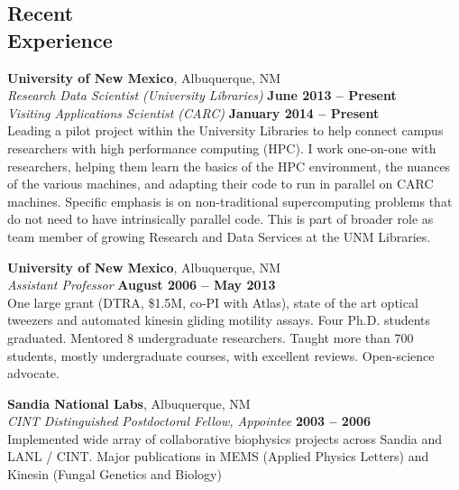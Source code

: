 \documentclass[margin,line]{resume}
\begin{document}
\begin{resume}
    \section{\mysidestyle Recent\\Experience}

    \textbf{University of New Mexico}, Albuquerque, NM \vspace{2mm}\\\vspace{1mm}%
    \textsl{Research Data Scientist (University Libraries)} \hfill \textbf{June 2013 -- Present}\\
    \textsl{Visiting Applications Scientist (CARC)} \hfill \textbf{January 2014 -- Present}\\
    Leading a pilot project within the University Libraries to help connect campus researchers with high performance computing (HPC). I work one-on-one with researchers, helping them learn the basics of the HPC environment, the nuances of the various machines, and adapting their code to run in parallel on CARC machines. Specific emphasis is on non-traditional supercomputing problems that do not need to have intrinsically parallel code. This is part of broader role as team member of growing Research and Data Services at the UNM Libraries.

    \textbf{University of New Mexico}, Albuquerque, NM \vspace{2mm}\\\vspace{1mm}%
    \textsl{Assistant Professor} \hfill \textbf{August 2006 -- May 2013}\\
    One large grant (DTRA, \$1.5M, co-PI with Atlas), state of the art optical tweezers and automated kinesin gliding motility assays. Four Ph.D. students graduated. Mentored 8 undergraduate researchers. Taught more than 700 students, mostly undergraduate courses, with excellent reviews.  Open-science advocate.

    \textbf{Sandia National Labs}, Albuquerque, NM \vspace{2mm}\\\vspace{1mm}%
    \textsl{CINT Distinguished Postdoctoral Fellow, Appointee} \hfill \textbf{2003 -- 2006}\\
    Implemented wide array of collaborative biophysics projects across Sandia and LANL / CINT.  Major publications in MEMS (Applied Physics Letters) and Kinesin (Fungal Genetics and Biology)

    

\end{resume}
\end{document}
